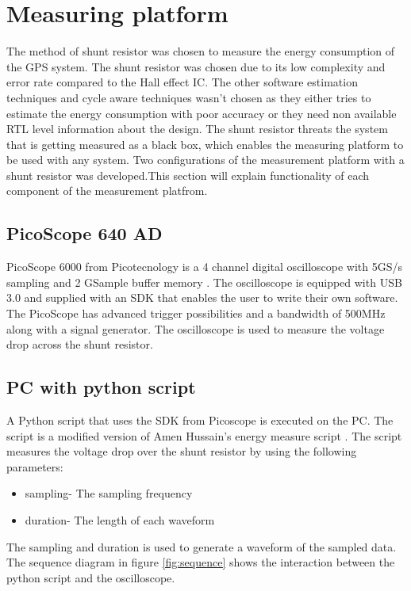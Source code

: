 \chapter{Measuring platform}

The method of shunt resistor was chosen to measure the energy consumption of the GPS system. The shunt resistor was chosen due to its low complexity and error rate compared to the Hall effect IC. The other software estimation techniques and cycle aware techniques wasn't chosen as they either tries to estimate the energy consumption with poor accuracy or they need non available RTL level information about the design. The shunt resistor threats the system that is getting measured as a black box, which enables the measuring platform to be used with any system. Two configurations of the measurement platform with a shunt resistor was developed.This section will explain functionality of each component of the measurement platfrom.


\section{PicoScope 640 AD}
PicoScope 6000 from Picotecnology is a 4 channel digital oscilloscope with 5GS/s sampling and 2 GSample buffer memory \cite{Pico}. The oscilloscope is equipped with USB 3.0 and supplied with an SDK that enables the user to write their own software. The PicoScope has advanced trigger possibilities and a bandwidth of 500MHz along with a signal generator. The oscilloscope is used to measure the voltage drop across the shunt resistor.   

\section{PC with python script}
A Python script that uses the SDK from Picoscope is executed on the PC. The script is a modified version of Amen Hussain's energy measure script \cite{Amen}. The script measures the voltage drop over the shunt resistor by using the following parameters:

\begin{itemize}
    \item sampling- The sampling frequency 
    \item duration- The length of each waveform
    
\end{itemize}
The sampling and duration is used to generate a waveform of the sampled data.
The sequence diagram in figure \ref{fig:sequence} shows the interaction between the python script and the oscilloscope.  

